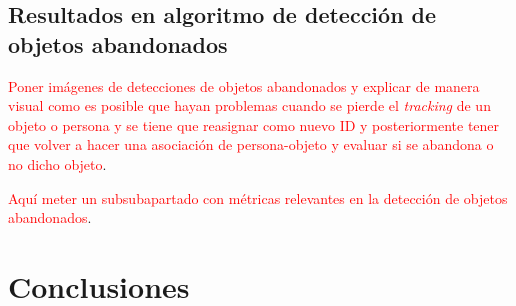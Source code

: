 \subsection{Resultados en algoritmo de detección de objetos abandonados}
\label{subsec:resultados-abandon-algorithm}

\textcolor{red}{Poner imágenes de detecciones de objetos abandonados y explicar de manera visual como es posible que hayan problemas cuando se pierde el \textit{tracking} de un objeto o persona y se tiene que reasignar como nuevo ID y posteriormente tener que volver a hacer una asociación de persona-objeto y evaluar si se abandona o no dicho objeto}.

\textcolor{red}{Aquí meter un subsubapartado con métricas relevantes en la detección de objetos abandonados}.

\section{Conclusiones}
\label{sec:conclu-resultados}